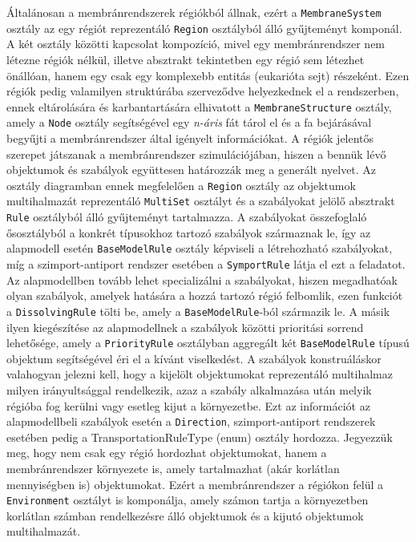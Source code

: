 Általánosan a membránrendszerek régiókból állnak, ezért a \verb|MembraneSystem| osztály az egy régiót reprezentáló \verb|Region| osztályból álló gyűjteményt komponál.  A két osztály közötti kapcsolat kompozíció, mivel egy membránrendszer nem létezne régiók nélkül, illetve absztrakt tekintetben egy régió sem létezhet önállóan, hanem egy csak egy komplexebb entitás (eukarióta sejt) részeként. Ezen régiók pedig valamilyen struktúrába szerveződve helyezkednek el a rendszerben, ennek eltárolására és karbantartására elhivatott a \verb|MembraneStructure| osztály, amely a \verb|Node| osztály segítségével egy \textit{n-áris} fát tárol el és a fa bejárásával begyűjti a membránrendszer által igényelt információkat. A régiók jelentős szerepet játszanak a membránrendszer szimulációjában, hiszen a bennük lévő objektumok és szabályok együttesen határozzák meg a generált nyelvet. Az osztály diagramban ennek megfelelően a \verb|Region| osztály  az objektumok multihalmazát reprezentáló \verb|MultiSet| osztályt és a szabályokat jelölő absztrakt \verb|Rule| osztályból álló gyűjteményt tartalmazza.
A szabályokat összefoglaló ősosztályból a konkrét típusokhoz tartozó szabályok származnak le, így az alapmodell esetén \verb|BaseModelRule| osztály képviseli a létrehozható szabályokat, míg a szimport-antiport rendszer esetében a \verb|SymportRule| látja el ezt a feladatot. Az alapmodellben tovább lehet specializálni a szabályokat, hiszen megadhatóak olyan szabályok, amelyek hatására a hozzá tartozó régió felbomlik, ezen funkciót a \verb|DissolvingRule| tölti be, amely a \verb|BaseModelRule|-ból származik le. A másik ilyen kiegészítése az alapmodellnek a szabályok közötti prioritási sorrend lehetősége, amely a \verb|PriorityRule| osztályban aggregált két \verb|BaseModelRule| típusú objektum segítségével éri el a kívánt viselkedést. A szabályok konstruáláskor valahogyan jelezni kell, hogy a kijelölt objektumokat reprezentáló multihalmaz milyen irányultsággal rendelkezik, azaz a szabály alkalmazása után melyik régióba fog kerülni vagy esetleg kijut a környezetbe. Ezt az információt az alapmodellbeli szabályok esetén a \verb|Direction|, szimport-antiport rendszerek esetében pedig a TransportationRuleType  (enum) osztály hordozza.
Jegyezzük meg, hogy nem csak egy régió hordozhat objektumokat, hanem a membránrendszer környezete is, amely tartalmazhat (akár korlátlan mennyiségben is) objektumokat. Ezért a membránrendszer a régiókon felül a \verb|Environment| osztályt is komponálja, amely számon tartja a környezetben korlátlan számban rendelkezésre álló objektumok és a kijutó objektumok multihalmazát.


